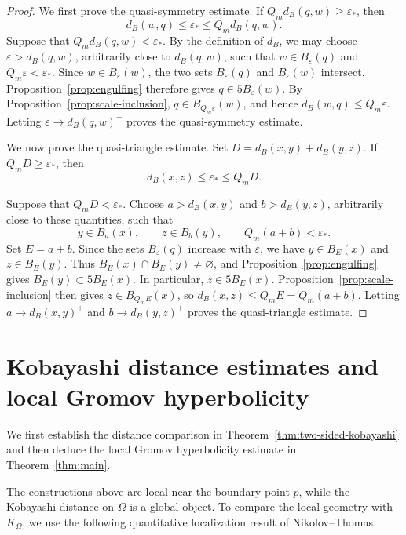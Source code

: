 \documentclass[11pt]{article}
\theoremstyle{definition}
\newcommand{\eps}{\varepsilon}
\begin{document}
\begin{proof}
	We first prove the quasi-symmetry estimate.  If
	\(Q_m d_B(q,w)\ge\eps_*\), then
	\[d_B(w,q)\le\eps_*\le Q_m d_B(q,w).\]
	Suppose that \(Q_m d_B(q,w)<\eps_*\).  By the definition of \(d_B\),
	we may choose \(\eps>d_B(q,w)\), arbitrarily close to
	\(d_B(q,w)\), such that \(w\in B_\eps(q)\) and
	\(Q_m\eps<\eps_*\).  Since \(w\in B_\eps(w)\), the two sets
	\(B_\eps(q)\) and \(B_\eps(w)\) intersect.  Proposition~\ref{prop:engulfing}
	therefore gives
	\(q\in 5B_\eps(w)\).
	By Proposition~\ref{prop:scale-inclusion},
	\(q\in B_{Q_m\eps}(w)\), and hence
	\(d_B(w,q)\le Q_m\eps\).
	Letting \(\eps\to d_B(q,w)^+\) proves the quasi-symmetry estimate.
	
	We now prove the quasi-triangle estimate.  Set
	\(D=d_B(x,y)+d_B(y,z)\).
	If \(Q_mD\ge\eps_*\), then
	\[d_B(x,z)\le\eps_*\le Q_mD.\]
	
	Suppose that \(Q_mD<\eps_*\).  Choose
	\(a>d_B(x,y)\) and \(b>d_B(y,z)\), arbitrarily close to these
	quantities, such that
	\[
	y\in B_a(x),\qquad z\in B_b(y),
	\qquad
	Q_m(a+b)<\eps_*.
	\]
	Set \(E=a+b\).  Since the sets \(B_\eps(q)\) increase with \(\eps\),
	we have \(y\in B_E(x)\) and \(z\in B_E(y)\).  Thus
	\(B_E(x)\cap B_E(y)\ne\varnothing\), and
	Proposition~\ref{prop:engulfing} gives
	\(B_E(y)\subset5B_E(x)\).
	In particular, \(z\in5B_E(x)\).  Proposition~\ref{prop:scale-inclusion}
	then gives \(z\in B_{Q_mE}(x)\), so
	\(d_B(x,z)\le Q_mE=Q_m(a+b)\).
	Letting \(a\to d_B(x,y)^+\) and
	\(b\to d_B(y,z)^+\) proves the quasi-triangle estimate.
\end{proof}



\section{Kobayashi distance estimates and local Gromov hyperbolicity}
\label{sec:kobayashi-comparison}

We first establish the distance comparison in
Theorem~\ref{thm:two-sided-kobayashi} and then deduce the local Gromov
hyperbolicity estimate in Theorem~\ref{thm:main}.

The constructions above are local near the boundary point \(p\), while the
Kobayashi distance on \(\Omega\) is a global object.  To compare the local
geometry with \(K_\Omega\), we use the following quantitative localization
result of Nikolov--Thomas.
\end{document}
